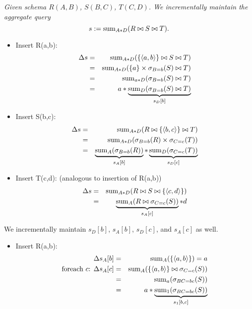 \begin{example}\em
Given schema $R(A,B)$, $S(B,C)$, $T(C,D)$.
We incrementally maintain the aggregate query
\[
s := \mathrm{sum}_{A*D}(R \bowtie S \bowtie T).
\]
\begin{itemize}
\item
Insert R(a,b):
\begin{eqnarray*}
\Delta s &=& \mathrm{sum}_{A*D}(\{{\langle a,b\rangle}\} \bowtie S \bowtie T)
\\ &=&
\mathrm{sum}_{A*D}(\{a\} \times \sigma_{B=b}(S) \bowtie T)
\\ &=&
\mathrm{sum}_{a*D}(\sigma_{B=b}(S) \bowtie T)
\\ &=&
a * \underbrace{\mathrm{sum}_{D}(\sigma_{B=b}(S) \bowtie T)}_{s_D[b]}
\end{eqnarray*}

\item
Insert S(b,c):
\begin{eqnarray*}
\Delta s &=& \mathrm{sum}_{A*D}(R \bowtie \{{\langle b,c\rangle}\} \bowtie T)
\\ &=&
\mathrm{sum}_{A*D}(\sigma_{B=b}(R) \times \sigma_{C=c}(T))
\\ &=&
\underbrace{\mathrm{sum}_{A}(\sigma_{B=b}(R))}_{s_A[b]} *
\underbrace{\mathrm{sum}_{D}(\sigma_{C=c}(T))}_{s_D[c]}
\end{eqnarray*}

\item
Insert T(c,d): (analogous to insertion of R(a,b))
\begin{eqnarray*}
\Delta s &=& \mathrm{sum}_{A*D}(R \bowtie S \bowtie \{{\langle c,d\rangle}\})
\\ &=&
\underbrace{\mathrm{sum}_{A}(R \bowtie \sigma_{C=c}(S))}_{s_A[c]} * d
\end{eqnarray*}
\end{itemize}

We incrementally maintain $s_D[b]$, $s_A[b]$, $s_D[c]$, and
$s_A[c]$ as well.

\begin{itemize}
\item
Insert R(a,b):
\begin{eqnarray*}
\Delta s_A[b] &=& \mathrm{sum}_{A}(\{{\langle a,b\rangle}\}) = a
\\
\mbox{foreach $c$: }
\Delta s_A[c] &=& \mathrm{sum}_{A}(\{{\langle a,b\rangle}\} \bowtie \sigma_{C=c}(S))
\\ &=&
\mathrm{sum}_{a}(\sigma_{BC=bc}(S))
\\ &=&
a * \underbrace{\mathrm{sum}_{1}(\sigma_{BC=bc}(S))}_{s_1[b,c]}
\end{eqnarray*}


\end{itemize}
\end{example}
